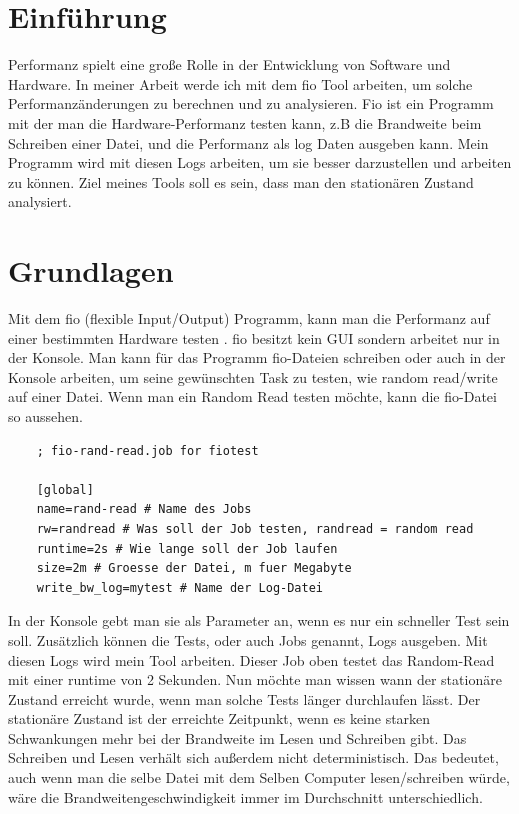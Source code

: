 \documentclass{article}
\begin{document}
\tableofcontents{}


\newpage
\section{Einführung}
Performanz spielt eine große Rolle in der Entwicklung von Software und Hardware.
In meiner Arbeit werde ich mit dem fio Tool arbeiten, um solche Performanzänderungen zu berechnen und zu analysieren.
Fio ist ein Programm mit der man die Hardware-Performanz testen kann, z.B die Brandweite beim Schreiben einer Datei, und die Performanz als log Daten ausgeben kann.
Mein Programm wird mit diesen Logs arbeiten, um sie besser darzustellen und arbeiten zu können. Ziel meines Tools soll es sein, dass man den stationären Zustand analysiert.


\section{Grundlagen}
Mit dem fio (flexible Input/Output) Programm, kann man die Performanz auf einer bestimmten Hardware testen .
fio besitzt kein GUI sondern arbeitet nur in der Konsole. Man kann für das Programm fio-Dateien schreiben oder auch in der Konsole arbeiten, um seine gewünschten Task zu testen,
wie random read/write auf einer Datei.
Wenn man ein Random Read testen möchte, kann die fio-Datei so aussehen.

\begin{lstlisting}
    ; fio-rand-read.job for fiotest

    [global]
    name=rand-read # Name des Jobs
    rw=randread # Was soll der Job testen, randread = random read
    runtime=2s # Wie lange soll der Job laufen
    size=2m # Groesse der Datei, m fuer Megabyte
    write_bw_log=mytest # Name der Log-Datei

\end{lstlisting}
In der Konsole gebt man sie als Parameter an, wenn es nur ein schneller Test sein soll. Zusätzlich können die Tests, 
oder auch Jobs genannt, Logs ausgeben. Mit diesen Logs wird mein Tool arbeiten. Dieser Job oben testet das Random-Read mit einer
runtime von 2 Sekunden. Nun möchte man wissen wann der stationäre Zustand erreicht wurde, wenn man solche Tests länger durchlaufen lässt.
Der stationäre Zustand ist der erreichte Zeitpunkt, wenn es keine starken Schwankungen mehr bei der Brandweite im Lesen und Schreiben gibt.
Das Schreiben und Lesen verhält sich außerdem nicht deterministisch. Das bedeutet, auch wenn man die selbe Datei mit dem Selben Computer lesen/schreiben
würde, wäre die Brandweitengeschwindigkeit immer im Durchschnitt unterschiedlich.
\end{document}
